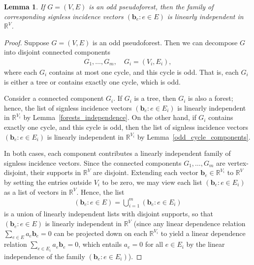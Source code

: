 \documentclass[12pt]{article}
\newtheorem{lemma}[theorem]{Lemma}
\theoremstyle{definition}
\theoremstyle{remark}
\newcommand{\tup}[1]{\left( #1 \right)}
\begin{document}
\begin{lemma}\label{ood_pseudoforest_independence}
    If $G=(V,E)$ is an odd pseudoforest, then the family of corresponding signless incidence vectors $\tup{\mathbf{b}_e : e \in E}$ is linearly independent in $\mathbb{R}^V$.
\end{lemma}

\begin{proof}
    Suppose $G=(V,E)$ is an odd pseudoforest. Then we can decompose $G$ into disjoint connected components \begin{align*}
        G_1,\ldots,G_m, \quad G_i = (V_i,E_i),
    \end{align*} where each $G_i$ contains at most one cycle, and this cycle is odd. That is, each $G_i$ is either a tree or contains exactly one cycle, which is odd.

    Consider a connected component $G_i$. If $G_i$ is a tree, then $G_i$ is also a forest; hence, the list of signless incidence vectors $\tup{\mathbf{b}_e : e \in E_i}$ is linearly independent in $\mathbb{R}^{V_i}$ by Lemma~\ref{forests_independence}. On the other hand, if $G_i$ contains exactly one cycle, and this cycle is odd, then the list of signless incidence vectors $\tup{\mathbf{b}_e : e \in E_i}$ is linearly independent in $\mathbb{R}^{V_i}$ by Lemma~\ref{odd_cycle_components}.

    In both cases, each component contributes a linearly independent family of signless incidence vectors. Since the connected components $G_1,\ldots,G_m$ are vertex-disjoint, their supports in $\mathbb{R}^V$ are disjoint. Extending each vector $\mathbf{b}_e \in \mathbb{R}^{V_i}$ to $\mathbb{R}^V$ by setting the entries outside $V_i$ to be zero, we may view each list $\tup{\mathbf{b}_e : e \in E_i}$ as a list of vectors in $\mathbb{R}^V$. Hence, the list \begin{align*}
        \tup{\mathbf{b}_e : e \in E} = \bigcup_{i=1}^m\tup{\mathbf{b}_e : e \in E_i}
    \end{align*} is a union of linearly independent lists with disjoint supports, so that $\tup{\mathbf{b}_e : e \in E}$ is linearly independent in $\mathbb{R}^V$
    (since any linear dependence relation $\sum_{e \in E} a_e \mathbf{b}_e = 0$ can be projected down on each $\mathbb{R}^{V_i}$ to yield a linear dependence relation $\sum_{e \in E_i} a_e \mathbf{b}_e = 0$, which entails $a_e = 0$ for all $e \in E_i$ by the linear independence of the family $\tup{\mathbf{b}_e : e \in E_i}$).
\end{proof}
\end{document}
